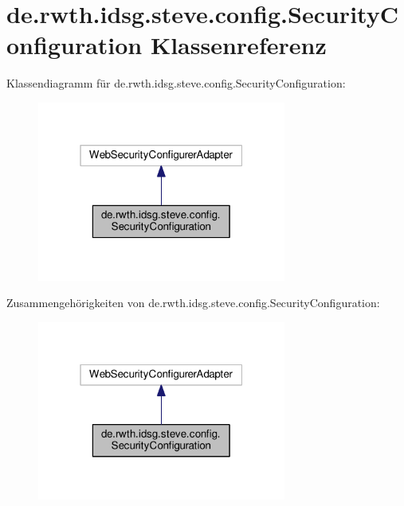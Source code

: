 \hypertarget{classde_1_1rwth_1_1idsg_1_1steve_1_1config_1_1_security_configuration}{\section{de.\-rwth.\-idsg.\-steve.\-config.\-Security\-Configuration Klassenreferenz}
\label{classde_1_1rwth_1_1idsg_1_1steve_1_1config_1_1_security_configuration}
}


Klassendiagramm für de.\-rwth.\-idsg.\-steve.\-config.\-Security\-Configuration\-:
\nopagebreak
\begin{figure}[H]
\begin{center}
\leavevmode
\includegraphics[width=232pt]{classde_1_1rwth_1_1idsg_1_1steve_1_1config_1_1_security_configuration__inherit__graph}
\end{center}
\end{figure}


Zusammengehörigkeiten von de.\-rwth.\-idsg.\-steve.\-config.\-Security\-Configuration\-:
\nopagebreak
\begin{figure}[H]
\begin{center}
\leavevmode
\includegraphics[width=232pt]{classde_1_1rwth_1_1idsg_1_1steve_1_1config_1_1_security_configuration__coll__graph}
\end{center}
\end{figure}
